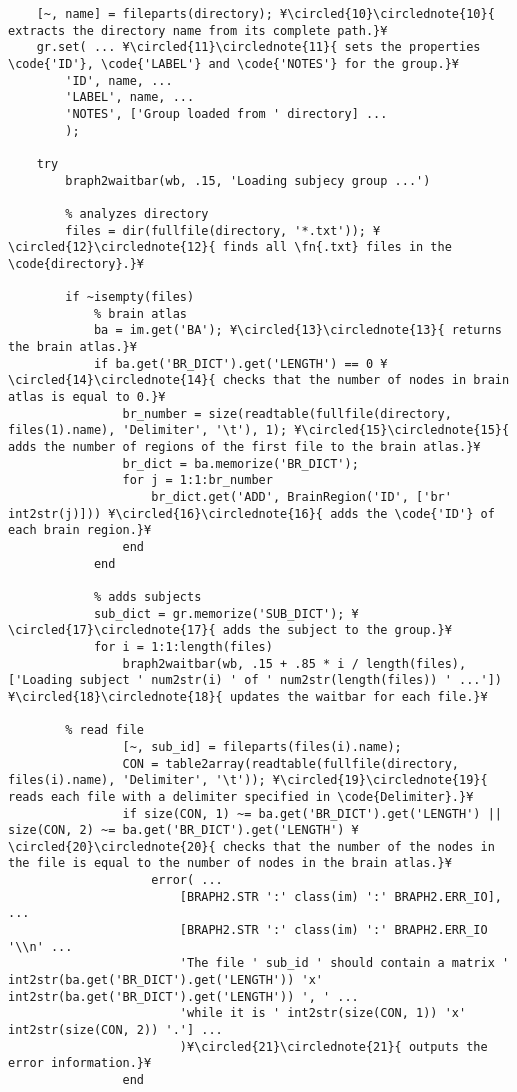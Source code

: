 \documentclass{tufte-handout}
\begin{document}
\begin{lstlisting}
    [~, name] = fileparts(directory); ¥\circled{10}\circlednote{10}{ extracts the directory name from its complete path.}¥
    gr.set( ... ¥\circled{11}\circlednote{11}{ sets the properties \code{'ID'}, \code{'LABEL'} and \code{'NOTES'} for the group.}¥
        'ID', name, ...
        'LABEL', name, ...
        'NOTES', ['Group loaded from ' directory] ...
        );

    try
        braph2waitbar(wb, .15, 'Loading subjecy group ...')

        % analyzes directory
        files = dir(fullfile(directory, '*.txt')); ¥\circled{12}\circlednote{12}{ finds all \fn{.txt} files in the \code{directory}.}¥

        if ~isempty(files) 
            % brain atlas
            ba = im.get('BA'); ¥\circled{13}\circlednote{13}{ returns the brain atlas.}¥
            if ba.get('BR_DICT').get('LENGTH') == 0 ¥\circled{14}\circlednote{14}{ checks that the number of nodes in brain atlas is equal to 0.}¥
                br_number = size(readtable(fullfile(directory, files(1).name), 'Delimiter', '\t'), 1); ¥\circled{15}\circlednote{15}{ adds the number of regions of the first file to the brain atlas.}¥
                br_dict = ba.memorize('BR_DICT');
                for j = 1:1:br_number
                    br_dict.get('ADD', BrainRegion('ID', ['br' int2str(j)])) ¥\circled{16}\circlednote{16}{ adds the \code{'ID'} of each brain region.}¥
                end
            end

            % adds subjects
            sub_dict = gr.memorize('SUB_DICT'); ¥\circled{17}\circlednote{17}{ adds the subject to the group.}¥
            for i = 1:1:length(files)
                braph2waitbar(wb, .15 + .85 * i / length(files), ['Loading subject ' num2str(i) ' of ' num2str(length(files)) ' ...']) ¥\circled{18}\circlednote{18}{ updates the waitbar for each file.}¥

		% read file
                [~, sub_id] = fileparts(files(i).name);
                CON = table2array(readtable(fullfile(directory, files(i).name), 'Delimiter', '\t')); ¥\circled{19}\circlednote{19}{ reads each file with a delimiter specified in \code{Delimiter}.}¥
                if size(CON, 1) ~= ba.get('BR_DICT').get('LENGTH') || size(CON, 2) ~= ba.get('BR_DICT').get('LENGTH') ¥\circled{20}\circlednote{20}{ checks that the number of the nodes in the file is equal to the number of nodes in the brain atlas.}¥
                    error( ...
                        [BRAPH2.STR ':' class(im) ':' BRAPH2.ERR_IO], ...
                        [BRAPH2.STR ':' class(im) ':' BRAPH2.ERR_IO '\\n' ...
                        'The file ' sub_id ' should contain a matrix ' int2str(ba.get('BR_DICT').get('LENGTH')) 'x' int2str(ba.get('BR_DICT').get('LENGTH')) ', ' ...
                        'while it is ' int2str(size(CON, 1)) 'x' int2str(size(CON, 2)) '.'] ...
                        )¥\circled{21}\circlednote{21}{ outputs the error information.}¥
                end
                

\end{lstlisting}
\end{document}

